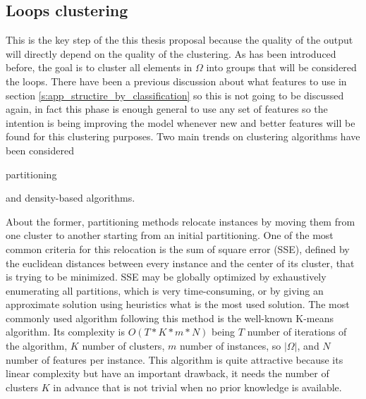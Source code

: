\subsection{Loops clustering}

This is the key step of the this thesis proposal because the quality of the
output will directly depend on the quality of the clustering. As has been introduced
before, the goal is to cluster all elements in $\Omega$ into groups that will be
considered the loops. There have been a previous discussion about what features
to use in section \ref{s:app_structire_by_classification} so this is not going to be
discussed again, in fact this phase is enough general to use any set of
features so the intention is being improving the model whenever new and better
features will be found for this clustering purposes. Two main trends on 
clustering algorithms have been considered \cite{rokach2005clustering}
\begin{enumerate*}[label=\roman*)]
  \item partitioning
  \item and density-based algorithms.
\end{enumerate*} 

About the former, partitioning methods relocate instances by moving them from
one cluster to another starting from an initial partitioning.
One of the most common criteria for this relocation is the sum of square error
(SSE), defined by the euclidean distances between every instance and the center
of its cluster, that is trying to be minimized. SSE may be globally optimized by 
exhaustively enumerating all partitions, which is very time-consuming, 
or by giving an approximate solution using heuristics what is the most used
solution. The most commonly used algorithm following this method is the 
well-known K-means algorithm. Its complexity is $O(T*K*m*N)$ being $T$ number of
iterations of the algorithm, $K$ number of clusters, $m$ number of instances, so
$|\Omega|$, and $N$ number of features per instance. This algorithm is quite attractive because
its linear complexity but have an important drawback, it needs the number of
clusters $K$ in advance that is not trivial when no prior knowledge is
available.

